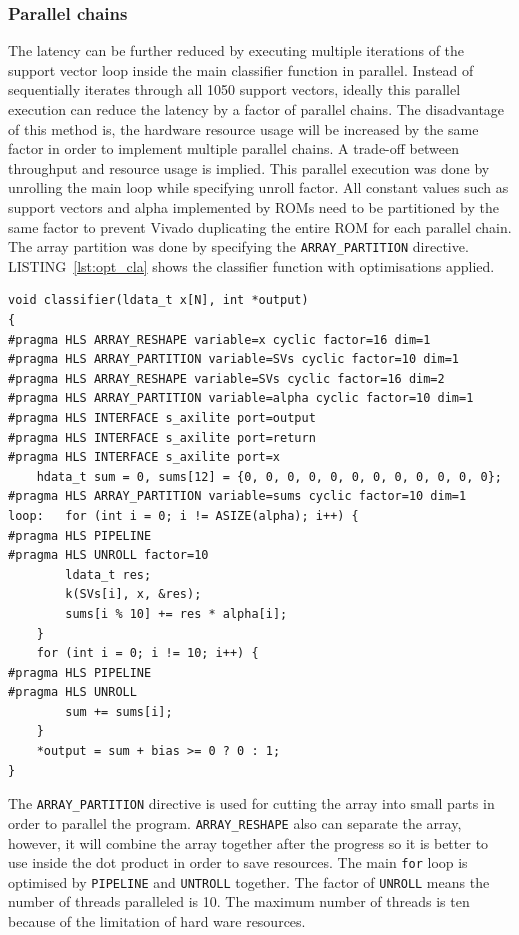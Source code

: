 \documentclass[journal]{IEEEtran}
\newcommand{\lref}[1]{LISTING~\ref{#1}}
\begin{document}
\subsubsection{Parallel chains}

The latency can be further reduced by executing multiple iterations of the support vector loop inside the main classifier function in parallel. Instead of sequentially iterates through all 1050 support vectors, ideally this parallel execution can reduce the latency by a factor of parallel chains.
The disadvantage of this method is, the hardware resource usage will be increased by the same factor in order to implement multiple parallel chains. A trade-off between throughput and resource usage is implied.
This parallel execution was done by unrolling the main loop while specifying unroll factor. All constant values such as support vectors and alpha implemented by ROMs need to be partitioned by the same factor to prevent Vivado duplicating the entire ROM for each parallel chain. The array partition was done by specifying the \texttt{ARRAY\_PARTITION} directive.
\lref{lst:opt_cla} shows the classifier function with optimisations applied.

\begin{lstlisting}[float,floatplacement=h,caption={Optimised classifier top-level function},captionpos=b,label=lst:opt_cla]
void classifier(ldata_t x[N], int *output)
{
#pragma HLS ARRAY_RESHAPE variable=x cyclic factor=16 dim=1
#pragma HLS ARRAY_PARTITION variable=SVs cyclic factor=10 dim=1
#pragma HLS ARRAY_RESHAPE variable=SVs cyclic factor=16 dim=2
#pragma HLS ARRAY_PARTITION variable=alpha cyclic factor=10 dim=1
#pragma HLS INTERFACE s_axilite port=output
#pragma HLS INTERFACE s_axilite port=return
#pragma HLS INTERFACE s_axilite port=x
	hdata_t sum = 0, sums[12] = {0, 0, 0, 0, 0, 0, 0, 0, 0, 0, 0, 0};
#pragma HLS ARRAY_PARTITION variable=sums cyclic factor=10 dim=1
loop:	for (int i = 0; i != ASIZE(alpha); i++) {
#pragma HLS PIPELINE
#pragma HLS UNROLL factor=10
		ldata_t res;
		k(SVs[i], x, &res);
		sums[i % 10] += res * alpha[i];
	}
	for (int i = 0; i != 10; i++) {
#pragma HLS PIPELINE
#pragma HLS UNROLL
		sum += sums[i];
	}
	*output = sum + bias >= 0 ? 0 : 1;
}
\end{lstlisting}

The \texttt{ARRAY\_PARTITION} directive is used for cutting the array into small parts in order to parallel the program. \texttt{ARRAY\_RESHAPE} also can separate the array, however, it will combine the array together after the progress so it is better to use inside the dot product in order to save resources. The main \texttt{for} loop is optimised by \texttt{PIPELINE} and \texttt{UNTROLL} together. The factor of \texttt{UNROLL} means the number of threads paralleled is 10. The maximum number of threads is ten because of the limitation of hard ware resources. 
\end{document}
